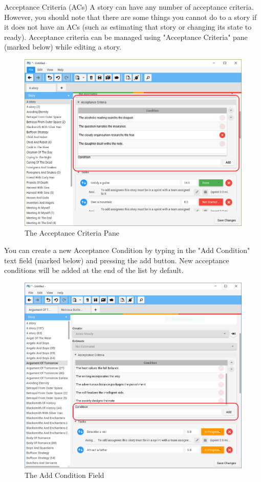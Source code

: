 Acceptance Criteria (ACs)\newline
A story can have any number of acceptance criteria. However, you should note that there are some things you cannot do to a story if it does not have an ACs (such as estimating that story or changing its state to ready). Acceptance criteria can be managed using "Acceptance Criteria" pane (marked below) while editing a story.

\begin{figure}[H]
\centering
\includegraphics[width=\textwidth]{images/screenshots/AcceptanceCriteria1.PNG}
\caption{The Acceptance Criteria Pane}
\label{fig:new_project}
\end{figure}

You can create a new Acceptance Condition by typing in the "Add Condition" text field (marked below) and pressing the add button. New acceptance conditions will be added at the end of the list by default.

\begin{figure}[H]
\centering
\includegraphics[width=\textwidth]{images/screenshots/AcceptanceCriteria2.PNG}
\caption{The Add Condition Field}
\label{fig:new_project}
\end{figure}

